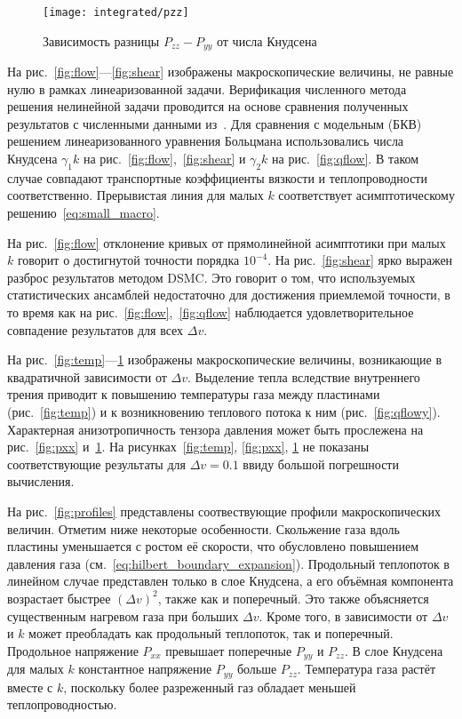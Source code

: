 \documentclass[a4paper,12pt]{article}
\begin{document}
\begin{figure}
    \centering
    \texttt{[image: integrated/pzz]}
    \caption{Зависимость разницы \(P_{zz}-P_{yy}\) от числа Кнудсена}
    \label{fig:pzz}
\end{figure}

На рис.~\ref{fig:flow}---\ref{fig:shear} изображены макроскопические величины,
не равные нулю в рамках линеаризованной задачи.
Верификация численного метода решения нелинейной задачи проводится на основе сравнения
полученных результатов с численными данными из~\cite{Sone1990}.
Для сравнения с модельным (БКВ) решением линеаризованного уравнения Больцмана
использовались числа Кнудсена \(\gamma_1k\) на рис.~\ref{fig:flow},~\ref{fig:shear} и
\(\gamma_2k\) на рис.~\ref{fig:qflow}. В таком случае совпадают транспортные коэффициенты
вязкости и теплопроводности соответственно. Прерывистая линия для малых \(k\) соответствует
асимптотическому решению~\eqref{eq:small_macro}.

На рис.~\ref{fig:flow} отклонение кривых от прямолинейной асимптотики при малых \(k\)
говорит о достигнутой точности порядка \(10^{-4}\).
На рис.~\ref{fig:shear} ярко выражен разброс результатов методом DSMC.
Это говорит о том, что используемых статистических ансамблей недостаточно для
достижения приемлемой точности, в то время как на рис.~\ref{fig:flow},~\ref{fig:qflow}
наблюдается удовлетворительное совпадение результатов для всех \(\Delta{v}\).

На рис.~\ref{fig:temp}---\ref{fig:pzz} изображены макроскопические величины,
возникающие в квадратичной зависимости от \(\Delta{v}\).
Выделение тепла вследствие внутреннего трения приводит к повышению температуры газа
между пластинами (рис.~\ref{fig:temp}) и к возникновению теплового потока к ним (рис.~\ref{fig:qflowy}).
Характерная анизотропичность тензора давления может быть прослежена на рис.~\ref{fig:pxx} и~\ref{fig:pzz}.
На рисунках~\ref{fig:temp}, \ref{fig:pxx}, \ref{fig:pzz} не показаны соответствующие результаты для \(\Delta{v}=0.1\)
ввиду большой погрешности вычисления.

На рис.~\ref{fig:profiles} представлены соотвествующие профили макроскопических величин.
Отметим ниже некоторые особенности.
Скольжение газа вдоль пластины уменьшается с ростом её скорости,
что обусловлено повышением давления газа (см.~\eqref{eq:hilbert_boundary_expansion}).
Продольный теплопоток в линейном случае представлен только в слое Кнудсена,
а его объёмная компонента возрастает быстрее \((\Delta{v})^2\), также как и поперечный.
Это также объясняется существенным нагревом газа при больших \(\Delta{v}\).
Кроме того, в зависимости от \(\Delta{v}\) и \(k\) может преобладать
как продольный теплопоток, так и поперечный.
Продольное напряжение \(P_{xx}\) превышает поперечные \(P_{yy}\) и \(P_{zz}\).
В слое Кнудсена для малых \(k\) константное напряжение \(P_{yy}\) больше \(P_{zz}\).
Температура газа растёт вместе с \(k\), поскольку более разреженный газ
обладает меньшей теплопроводностью.
\end{document}
